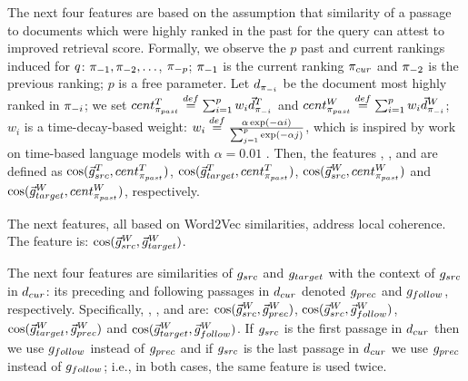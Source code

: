 The next four features are based on the assumption that similarity of a passage to documents which were highly ranked in the past for the query can attest to improved retrieval score.
Formally, we observe the $p$ past and current rankings induced for $q$:
$\pi_{-1}, \pi_{-2}, \ldots$, $\pi_{-p}$; $\pi_{-1}$ is the current ranking $\pi_{cur}$ and $\pi_{-2}$ is the previous ranking; $p$ is a free parameter. Let $d_{\pi_{-i}}$ be the document
most highly ranked in $\pi_{-i}$; we set $cent^{T}_{\pi_{past}}
  \stackrel{def}{=} \sum_{i=1}^{p} w_i \vec{d}^{T}_{\pi_{-i}}$ and
    $cent^{W}_{\pi_{past}} \stackrel{def}{=}
      \sum_{i=1}^{p} w_i \vec{d}^{W}_{\pi_{-i}}$; $w_i$ is a time-decay-based weight:
$w_i \stackrel{def}{=} \frac{\alpha \exp (-\alpha i )  }{\sum_{j=1}^{p} \exp (-\alpha
  j)}$, which is inspired by work on time-based
language models \cite{Li+Croft:03a} with $\alpha=0.01$ \cite{Li+Croft:03a}. Then, the features {\simSrcPrevTopTF}, {\simTargetPrevTopTF}, {\simSrcPrevTopWtV} and
{\simTargetPrevTopWtV} are defined as
$\cos(\vec{g}^{T}_{src},cent^{T}_{\pi_{past}})$, $\cos(\vec{g}^{T}_{target},cent^{T}_{\pi_{past}})$, $\cos(\vec{g}^{W}_{src},cent^{W}_{\pi_{past}})$ and
$\cos(\vec{g}^{W}_{target},cent^{W}_{\pi_{past}})$, respectively.

The next features, all
based on Word2Vec similarities, address local coherence. The {\simSrcTargetWtV} feature is: $\cos
(\vec{g}^{W}_{src},\vec{g}^{W}_{target})$.

The next four
features are similarities of $g_{src}$ and $g_{target}$ with the
context of $g_{src}$ in $d_{cur}$: its preceding and following passages in
$d_{cur}$ denoted $g_{prec}$ and $g_{follow}$, respectively. Specifically, {\simSrcPrevWtV}, {\simSrcNextWtV},
{\simTargetPrevWtV} and {\simTargetNextWtV} are:
$\cos(\vec{g}^{W}_{src},\vec{g}^{W}_{prec})$,
$\cos(\vec{g}^{W}_{src},\vec{g}^{W}_{follow})$,
$\cos(\vec{g}^{W}_{target},\vec{g}^{W}_{prec})$
and $\cos(\vec{g}^{W}_{target},\vec{g}^{W}_{follow})$. If
  $g_{src}$ is the first passage in $d_{cur}$ then we use $g_{follow}$
  instead of $g_{prec}$ and if $g_{src}$ is the last passage in
  $d_{cur}$ we use $g_{prec}$ instead of $g_{follow}$; i.e., in both
  cases, the same feature is used twice.






















